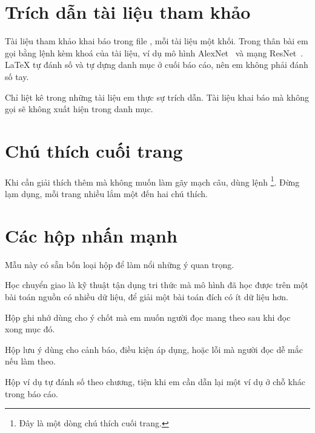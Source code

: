 \section{Trích dẫn tài liệu tham khảo}

Tài liệu tham khảo khai báo trong file , mỗi tài liệu một
khối. Trong thân bài em gọi bằng lệnh  kèm khoá của tài liệu, ví
dụ mô hình AlexNet~\cite{Krizhevsky2012} và mạng ResNet~\cite{He2016}. LaTeX
tự đánh số và tự dựng danh mục ở cuối báo cáo, nên em không phải đánh số tay.

\begin{ghinho}
Chỉ liệt kê trong  những tài liệu em thực sự trích dẫn. Tài
liệu khai báo mà không gọi  sẽ không xuất hiện trong danh mục.
\end{ghinho}

\section{Chú thích cuối trang}

Khi cần giải thích thêm mà không muốn làm gãy mạch câu, dùng lệnh
\footnote{Đây là một dòng chú thích cuối trang.}. Đừng lạm
dụng, mỗi trang nhiều lắm một đến hai chú thích.

\section{Các hộp nhấn mạnh}

Mẫu này có sẵn bốn loại hộp để làm nổi những ý quan trọng.

\begin{dinhnghia}
Học chuyển giao  là kỹ thuật tận dụng tri thức mà mô
hình đã học được trên một bài toán nguồn có nhiều dữ liệu, để giải một bài
toán đích có ít dữ liệu hơn.
\end{dinhnghia}

\begin{ghinho}
Hộp ghi nhớ dùng cho ý chốt mà em muốn người đọc mang theo sau khi đọc xong
mục đó.
\end{ghinho}

\begin{luuy}
Hộp lưu ý dùng cho cảnh báo, điều kiện áp dụng, hoặc lỗi mà người đọc dễ mắc
nếu làm theo.
\end{luuy}

\begin{vidu}
Hộp ví dụ tự đánh số theo chương, tiện khi em cần dẫn lại một ví dụ ở chỗ
khác trong báo cáo.
\end{vidu}
